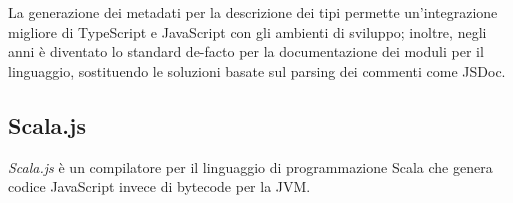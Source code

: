       La generazione dei metadati per la descrizione dei tipi permette un'integrazione migliore di TypeScript e JavaScript con gli ambienti di sviluppo;
      inoltre, negli anni è diventato lo standard de-facto per la documentazione dei moduli per il linguaggio, sostituendo le soluzioni basate sul parsing dei commenti come JSDoc.

    \subsection{Scala.js}\label{subsec:scalajs}
      \emph{Scala.js} è un compilatore per il linguaggio di programmazione Scala che genera codice JavaScript invece di bytecode per la JVM\@.

